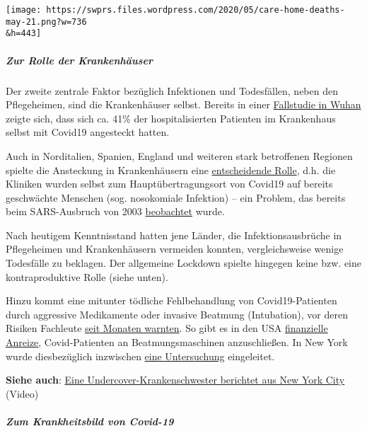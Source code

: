 \texttt{[image: https://swprs.files.wordpress.com/2020/05/care-home-deaths-may-21.png?w=736\\\&h=443]}

\hypertarget{zur-rolle-der-krankenhuxe4user}{%
\subparagraph{\texorpdfstring{\textbf{Zur Rolle der
Krankenhäuser}}{Zur Rolle der Krankenhäuser}}\label{zur-rolle-der-krankenhuxe4user}}

Der zweite zentrale Faktor bezüglich Infektionen und Todesfällen, neben
den Pflegeheimen, sind die Krankenhäuser selbst. Bereits in einer
\href{https://jamanetwork.com/journals/jama/fullarticle/2761044}{Fallstudie
in Wuhan} zeigte sich, dass sich ca. 41\% der hospitalisierten Patienten
im Krankenhaus selbst mit Covid19 angesteckt hatten.

Auch in Norditalien, Spanien, England und weiteren stark betroffenen
Regionen spielte die Ansteckung in Krankenhäusern eine
\href{https://medium.com/@tepper_jonathan/ground-zero-when-the-cure-is-worse-than-the-disease-3c513d91393d}{entscheidende
Rolle}, d.h. die Kliniken wurden selbst zum Hauptübertragungsort von
Covid19 auf bereits geschwächte Menschen (sog. nosokomiale Infektion) --
ein Problem, das bereits beim SARS-Ausbruch von 2003
\href{https://onlinelibrary.wiley.com/doi/10.1046/j.1440-1843.2003.00523.x}{beobachtet}
wurde.

Nach heutigem Kenntnisstand hatten jene Länder, die Infektions­ausbrüche
in Pflegeheimen und Krankenhäusern vermeiden konnten, vergleichsweise
wenige Todesfälle zu beklagen. Der allgemeine Lockdown spielte hingegen
keine bzw. eine kontraproduktive Rolle (siehe unten).

Hinzu kommt eine mitunter tödliche Fehlbehandlung von Covid19-Patienten
durch aggressive Medikamente oder invasive Beatmung (Intubation), vor
deren Risiken Fachleute
\href{https://off-guardian.org/2020/05/06/covid19-are-ventilators-killing-people/}{seit
Monaten warnten}. So gibt es in den USA
\href{https://eu.usatoday.com/story/news/factcheck/2020/04/24/fact-check-medicare-hospitals-paid-more-covid-19-patients-coronavirus/3000638001/}{finanzielle
Anreize}, Covid-Patienten an Beatmungs­maschinen anzuschließen. In New
York wurde diesbezüglich inzwischen
\href{https://nypost.com/2020/05/29/northwell-health-probing-use-of-ventilators-for-covid-patients/}{eine
Untersuchung} eingeleitet.

\textbf{Siehe auch}:
\href{https://www.youtube.com/watch?v=UIDsKdeFOmQ}{Eine
Undercover-Krankenschwester berichtet aus New York City} (Video)

\hypertarget{zum-krankheitsbild-von-covid-19-1}{%
\subparagraph{\texorpdfstring{\textbf{Zum Krankheitsbild von
Covid-19}}{Zum Krankheitsbild von Covid-19}}\label{zum-krankheitsbild-von-covid-19-1}}

